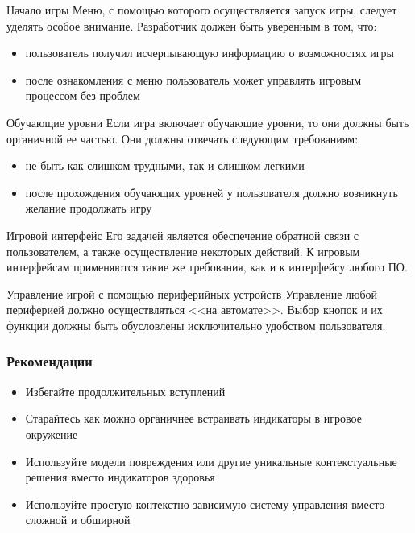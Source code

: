 \documentclass[10pt]{beamer}
\begin{document}
\begin{frame}

\begin{block}{Начало игры}
  Меню, с помощью которого осуществляется запуск игры, следует уделять особое внимание. Разработчик должен быть уверенным в том, что:
  \begin{itemize}
    \item пользователь получил исчерпывающую информацию о возможностях игры
    \item после ознакомления с меню пользователь может управлять игровым процессом без проблем
  \end{itemize}
\end{block}

\begin{block}{Обучающие уровни}
  Если игра включает обучающие уровни, то они должны быть органичной ее частью. Они должны отвечать следующим требованиям:
  \begin{itemize}
    \item не быть как слишком трудными, так и слишком легкими
    \item после прохождения обучающих уровней у пользователя должно возникнуть желание продолжать игру
  \end{itemize}
\end{block}

\end{frame}


\begin{frame}

\begin{block}{Игровой интерфейс}
  Его задачей является обеспечение обратной связи с пользователем, а также осуществление некоторых действий. К игровым интерфейсам применяются такие же требования, как и к интерфейсу любого ПО.
\end{block}

\begin{block}{Управление игрой с помощью периферийных устройств}
  Управление любой периферией должно осуществляться <<на автомате>>. Выбор кнопок и их функции должны быть обусловлены исключительно удобством пользователя.
\end{block}

\end{frame}

\begin{frame}
\frametitle{Рекомендации}

\begin{block}{}
  \begin{itemize}
    \item Избегайте продолжительных вступлений
    \item Старайтесь как можно органичнее встраивать индикаторы в игровое окружение
    \item Используйте модели повреждения или другие уникальные контекстуальные решения вместо индикаторов здоровья
    \item Используйте простую контекстно зависимую систему управления вместо сложной и обширной
  \end{itemize}
\end{block}

\end{frame}
\end{document}
